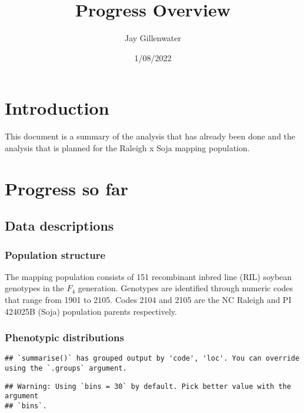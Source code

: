 \documentclass[
]{article}
\title{Progress Overview}
\author{Jay Gillenwater}
\date{1/08/2022}
\begin{document}
\maketitle

\hypertarget{introduction}{%
\section{Introduction}\label{introduction}}

This document is a summary of the analysis that has already been done
and the analysis that is planned for the Raleigh x Soja mapping
population.

\hypertarget{progress-so-far}{%
\section{Progress so far}\label{progress-so-far}}

\hypertarget{data-descriptions}{%
\subsection{Data descriptions}\label{data-descriptions}}

\hypertarget{population-structure}{%
\subsubsection{Population structure}\label{population-structure}}

The mapping population consists of 151 recombinant inbred line (RIL)
soybean genotypes in the \(F_4\) generation. Genotypes are identified
through numeric codes that range from 1901 to 2105. Codes 2104 and 2105
are the NC Raleigh and PI 424025B (Soja) population parents
respectively.

\hypertarget{phenotypic-distributions}{%
\subsubsection{Phenotypic
distributions}\label{phenotypic-distributions}}

\newpage

\begin{verbatim}
## `summarise()` has grouped output by 'code', 'loc'. You can override using the `.groups` argument.
\end{verbatim}

\begin{verbatim}
## Warning: Using `bins = 30` by default. Pick better value with the argument
## `bins`.
\end{verbatim}
\end{document}

